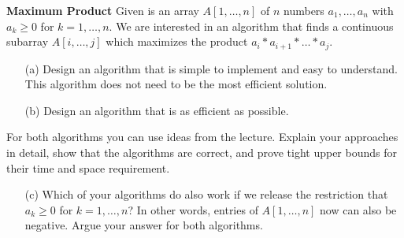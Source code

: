\documentclass[9pt]{article}
\begin{document}
{\bf Maximum Product}
Given is an array $A[1,\ldots ,n]$ of $n$ numbers $a_1,\ldots,a_n$ with $a_k \geq 0$ for $k=1,\ldots ,n$.
We are interested in an algorithm that finds a continuous subarray $A[i,\ldots ,j]$ which maximizes the product $a_i*a_{i+1}*\ldots * a_j$.
\begin{enumerate}
\item[(a)] Design an algorithm that is simple to implement and easy to understand. This algorithm does not need to be the most efficient solution.

\item[(b)] Design an algorithm that is as efficient as possible.
\end{enumerate}
 For both algorithms you can use ideas from the lecture. Explain your approaches in detail, show that the algorithms are correct, and prove tight upper bounds for their time and space requirement. 
\begin{itemize}
\item[(c)] Which of your algorithms do also work if we release the restriction that  $a_k \geq 0$ for $k=1,\ldots ,n$? In other words, entries of $A[1,\ldots ,n]$ now can also be negative. Argue your answer for both algorithms.
\end{itemize}

\vspace{1cm}
\end{document}

